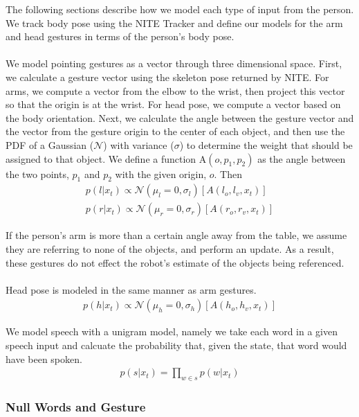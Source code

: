 \documentclass[a4paper, 11pt]{article} %
\begin{document}
\noindent The following sections describe how we model each type of
input from the person.  We track body pose using the NITE
Tracker and define our models for the arm and head
gestures in terms of the person's body pose.\\\\
  We model pointing gestures as a vector
through three dimensional space.  First, we calculate a gesture vector
using the skeleton pose returned by NITE.  For arms, we compute a
vector from the elbow to the wrist, then project this vector so that the origin is at the wrist.  For head pose, we compute a
vector based on the body orientation. Next, we calculate the angle between the gesture
vector and the vector from the gesture origin to the center of each object, and then use the PDF of a Gaussian ($\mathcal{N}$) with
variance ($\sigma$) to determine the weight that should be assigned to
that object. We define a function $\mbox{A}(o, p_1, p_2)$ as the angle
between the two points, $p_1$ and $p_2$ with the given origin, $o$.
Then
\begin{align}
p(l | x_t) \propto \mathcal{N}(\mu_l=0, \sigma_l)[A(l_o, l_v, x_t)]\\
p(r | x_t) \propto \mathcal{N}(\mu_r=0, \sigma_r)[A(r_o, r_v, x_t)]
\end{align}

If the person's arm is more than a certain angle away from the table,
we assume they are referring to none of the objects, and perform an
update.  As a result, these gestures do not effect the robot's
estimate of the objects being referenced.\\\\
Head pose is modeled in the same manner as arm gestures.
\begin{align}
p(h | x_t) \propto \mathcal{N}(\mu_h=0, \sigma_h)[A(h_o, h_v, x_t)]
\end{align}


  We model speech with a unigram model, namely we
take each word in a given speech input and calcuate the probability that, given the state, that word would have been spoken.
\begin{align}
p(s |x_t) = \displaystyle \prod_{w \in s} p(w | x_t)
\end{align}
\subsubsection{Null Words and Gesture}
\end{document}
